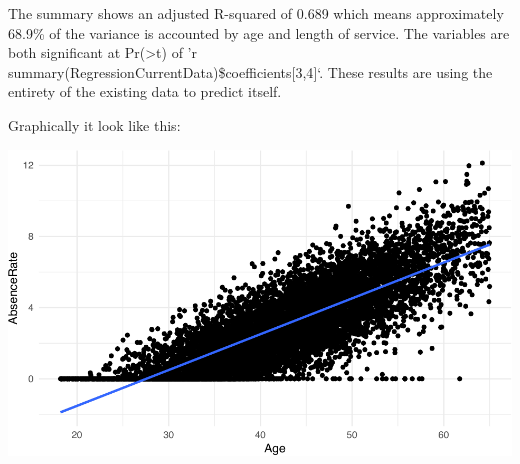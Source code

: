 \documentclass[12pt, krantz2,]{krantz}
\makeatletter
\newenvironment{Shaded}{\begin{snugshade}}{\end{snugshade}}
\newcommand{\CommentTok}[1]{\textcolor[rgb]{0.37,0.37,0.37}{\textit{#1}}}
\newcommand{\DataTypeTok}[1]{\textcolor[rgb]{0.27,0.27,0.27}{#1}}
\newcommand{\KeywordTok}[1]{\textcolor[rgb]{0.27,0.27,0.27}{\textbf{#1}}}
\newcommand{\NormalTok}[1]{#1}
\newcommand{\OperatorTok}[1]{\textcolor[rgb]{0.43,0.43,0.43}{\textbf{#1}}}
\newcommand{\StringTok}[1]{\textcolor[rgb]{0.5,0.5,0.5}{#1}}
\newenvironment{kframe}{%
\medskip{}
\setlength{\fboxsep}{.8em}
 \def\at@end@of@kframe{}%
 \ifinner\ifhmode%
  \def\at@end@of@kframe{\end{minipage}}%
  \begin{minipage}{\columnwidth}%
 \fi\fi%
 \def\FrameCommand##1{\hskip\@totalleftmargin \hskip-\fboxsep
 \colorbox{shadecolor}{##1}\hskip-\fboxsep
     \hskip-\linewidth \hskip-\@totalleftmargin \hskip\columnwidth}%
 \MakeFramed {\advance\hsize-\width
   \@totalleftmargin\z@ \linewidth\hsize
   \@setminipage}}%
 {\par\unskip\endMakeFramed%
 \at@end@of@kframe}
\renewenvironment{Shaded}{\begin{kframe}}{\end{kframe}}
\makeatother
\begin{document}
The summary shows an adjusted R-squared of 0.689 which means approximately 68.9\% of the variance is accounted by age and length of service.
The variables are both significant at Pr(\textgreater{}\textbar{}t\textbar{}) of 'r summary(RegressionCurrentData)\$coefficients{[}3,4{]}`. These results are using the entirety of the existing data to predict itself.

Graphically it look like this:

\begin{Shaded}
\end{Shaded}

\includegraphics[width=\textwidth]{hendrikfeddersen_files/figure-latex/unnamed-chunk-17-1}
\end{document}
